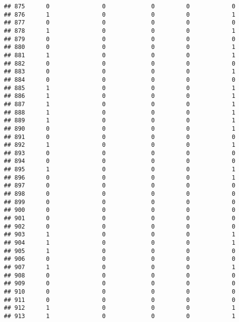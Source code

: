 \documentclass[]{article}
\begin{document}
\begin{verbatim}
## 875      0               0             0         0            0
## 876      1               0             0         0            1
## 877      0               0             0         0            0
## 878      1               0             0         0            1
## 879      0               0             0         0            0
## 880      0               0             0         0            1
## 881      1               0             0         0            1
## 882      0               0             0         0            0
## 883      0               0             0         0            1
## 884      0               0             0         0            0
## 885      1               0             0         0            1
## 886      1               0             0         0            1
## 887      1               0             0         0            1
## 888      1               0             0         0            1
## 889      1               0             0         0            1
## 890      0               0             0         0            1
## 891      0               0             0         0            0
## 892      1               0             0         0            1
## 893      0               0             0         0            0
## 894      0               0             0         0            0
## 895      1               0             0         0            1
## 896      0               0             0         0            1
## 897      0               0             0         0            0
## 898      0               0             0         0            0
## 899      0               0             0         0            0
## 900      0               0             0         0            0
## 901      0               0             0         0            0
## 902      0               0             0         0            0
## 903      1               0             0         0            1
## 904      1               0             0         0            1
## 905      1               0             0         0            0
## 906      0               0             0         0            0
## 907      1               0             0         0            1
## 908      0               0             0         0            0
## 909      0               0             0         0            0
## 910      0               0             0         0            0
## 911      0               0             0         0            0
## 912      1               0             0         0            1
## 913      1               0             0         0            1

\end{verbatim}
\end{document}
